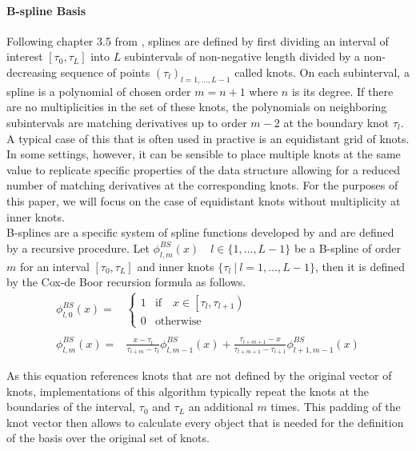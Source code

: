 \documentclass[11pt,twoside,a4paper]{article}
\begin{document}
	\paragraph{B-spline Basis} Following chapter 3.5 from \cite{ramsay_functional_2005}, splines are defined by first dividing an interval of interest $[\tau_0, \tau_L]$ into $L$ subintervals of non-negative length divided by a non-decreasing sequence of points $(\tau_l)_{l = 1,\dots, L-1}$ called knots. On each subinterval, a spline is a polynomial of chosen order $m = n+1$ where $n$ is its degree. If there are no multiplicities in the set of these knots, the polynomials on neighboring subintervals are matching derivatives up to order $m-2$ at the boundary knot $\tau_l$. A typical case of this that is often used in practive is an equidistant grid of knots. In some settings, however, it can be sensible to place multiple knots at the same value to replicate specific properties of the data structure allowing for a reduced number of matching derivatives at the corresponding knots. For the purposes of this paper, we will focus on the case of equidistant knots without multiplicity at inner knots.\\
	
	B-splines are a specific system of spline functions developed by \cite{de_boor_practical_1978} and are defined by a recursive procedure. Let $\phi_{l,m}^{BS}(x) \quad l \in \{1,\dots,L-1\}$ be a B-spline of order $m$ for an interval $[\tau_0, \tau_L]$ and inner knots $\{\tau_l \: \vert \: l = 1,\dots, L-1\}$, then it is defined by the Cox-de Boor recursion formula as follows. 
	\begin{equation}
		\begin{split}
			\phi_{l,0}^{BS}(x) = &
			\begin{cases}
				1 & \text{if} \quad x \in \left[\tau_l, \tau_{l+1}\right)\\
				0 & \text{otherwise}
			\end{cases}\\ \\
			\phi_{l,m}^{BS}(x) = &\frac{x - \tau_l}{\tau_{l+m} - \tau_l} \phi_{l,m-1}^{BS}(x) + \frac{\tau_{l+m+1} - x}{\tau_{l+m+1} - \tau_{l+1}} \phi_{l+1,m-1}^{BS}(x)
		\end{split}
	\end{equation}
	
	As this equation references knots that are not defined by the original vector of knots, implementations of this algorithm typically repeat the knots at the boundaries of the interval, $\tau_0$ and $\tau_L$ an additional $m$ times. This padding of the knot vector then allows to calculate every object that is needed for the definition of the basis over the original set of knots.\\
	
\end{document}
